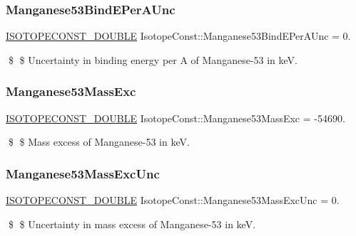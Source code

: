 \subsubsection{\texorpdfstring{Manganese53\+Bind\+E\+Per\+A\+Unc}{Manganese53BindEPerAUnc}}
{\footnotesize\ttfamily \mbox{\hyperlink{group___isotope_const-_macros_ga8f45a7272ce02c0b4c65c44636ed719a}{I\+S\+O\+T\+O\+P\+E\+C\+O\+N\+S\+T\+\_\+\+D\+O\+U\+B\+LE}} Isotope\+Const\+::\+Manganese53\+Bind\+E\+Per\+A\+Unc = 0.}

\$ \$ Uncertainty in binding energy per A of Manganese-\/53 in keV. \mbox{\label{group___isotope_const-_manganese-_mn53_ga938e5413bb553ad8eb5091c8328328c4}} 
\subsubsection{\texorpdfstring{Manganese53\+Mass\+Exc}{Manganese53MassExc}}
{\footnotesize\ttfamily \mbox{\hyperlink{group___isotope_const-_macros_ga8f45a7272ce02c0b4c65c44636ed719a}{I\+S\+O\+T\+O\+P\+E\+C\+O\+N\+S\+T\+\_\+\+D\+O\+U\+B\+LE}} Isotope\+Const\+::\+Manganese53\+Mass\+Exc = -\/54690.}

\$ \$ Mass excess of Manganese-\/53 in keV. \mbox{\label{group___isotope_const-_manganese-_mn53_ga9e3ba1771049d81e0f2f1d1b07d18fc6}} 
\subsubsection{\texorpdfstring{Manganese53\+Mass\+Exc\+Unc}{Manganese53MassExcUnc}}
{\footnotesize\ttfamily \mbox{\hyperlink{group___isotope_const-_macros_ga8f45a7272ce02c0b4c65c44636ed719a}{I\+S\+O\+T\+O\+P\+E\+C\+O\+N\+S\+T\+\_\+\+D\+O\+U\+B\+LE}} Isotope\+Const\+::\+Manganese53\+Mass\+Exc\+Unc = 0.}

\$ \$ Uncertainty in mass excess of Manganese-\/53 in keV. \mbox{\label{group___isotope_const-_manganese-_mn53_gac71f54a1b85dfe084effaa3ac4b37117}} 
